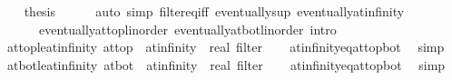 \begin{isabellebody}
\ \ \isamarkupfalse%
\ {\isacharquery}{\kern0pt}thesis\isanewline
\ \ \ \ \isamarkupfalse%
\ {\isacharparenleft}{\kern0pt}auto\ simp{\isacharcolon}{\kern0pt}\ filter{\isacharunderscore}{\kern0pt}eq{\isacharunderscore}{\kern0pt}iff\ eventually{\isacharunderscore}{\kern0pt}sup\ eventually{\isacharunderscore}{\kern0pt}at{\isacharunderscore}{\kern0pt}infinity\isanewline
\ \ \ \ \ \ eventually{\isacharunderscore}{\kern0pt}at{\isacharunderscore}{\kern0pt}top{\isacharunderscore}{\kern0pt}linorder\ eventually{\isacharunderscore}{\kern0pt}at{\isacharunderscore}{\kern0pt}bot{\isacharunderscore}{\kern0pt}linorder\ intro{\isacharcolon}{\kern0pt}\ {}\ {}\ {}{\isacharparenright}{\kern0pt}\isanewline
{}\isamarkupfalse%
%
\endisatagproof
{\isafoldproof}%
%
\isadelimproof
\isanewline
%
\endisadelimproof
\isanewline
{}\isamarkupfalse%
\ at{\isacharunderscore}{\kern0pt}top{\isacharunderscore}{\kern0pt}le{\isacharunderscore}{\kern0pt}at{\isacharunderscore}{\kern0pt}infinity{\isacharcolon}{\kern0pt}\ {\isachardoublequoteopen}at{\isacharunderscore}{\kern0pt}top\ {\isasymle}\ {\isacharparenleft}{\kern0pt}at{\isacharunderscore}{\kern0pt}infinity\ {\isacharcolon}{\kern0pt}{\isacharcolon}{\kern0pt}\ real\ filter{\isacharparenright}{\kern0pt}{\isachardoublequoteclose}\isanewline
%
\isadelimproof
\ \ %
\endisadelimproof
%
\isatagproof
{}\isamarkupfalse%
\ at{\isacharunderscore}{\kern0pt}infinity{\isacharunderscore}{\kern0pt}eq{\isacharunderscore}{\kern0pt}at{\isacharunderscore}{\kern0pt}top{\isacharunderscore}{\kern0pt}bot\ \isamarkupfalse%
\ simp%
\endisatagproof
{\isafoldproof}%
%
\isadelimproof
\isanewline
%
\endisadelimproof
\isanewline
{}\isamarkupfalse%
\ at{\isacharunderscore}{\kern0pt}bot{\isacharunderscore}{\kern0pt}le{\isacharunderscore}{\kern0pt}at{\isacharunderscore}{\kern0pt}infinity{\isacharcolon}{\kern0pt}\ {\isachardoublequoteopen}at{\isacharunderscore}{\kern0pt}bot\ {\isasymle}\ {\isacharparenleft}{\kern0pt}at{\isacharunderscore}{\kern0pt}infinity\ {\isacharcolon}{\kern0pt}{\isacharcolon}{\kern0pt}\ real\ filter{\isacharparenright}{\kern0pt}{\isachardoublequoteclose}\isanewline
%
\isadelimproof
\ \ %
\endisadelimproof
%
\isatagproof
{}\isamarkupfalse%
\ at{\isacharunderscore}{\kern0pt}infinity{\isacharunderscore}{\kern0pt}eq{\isacharunderscore}{\kern0pt}at{\isacharunderscore}{\kern0pt}top{\isacharunderscore}{\kern0pt}bot\ \isamarkupfalse%
\ simp%
\endisatagproof
{\isafoldproof}%
%
\isadelimproof

\end{isabellebody}
